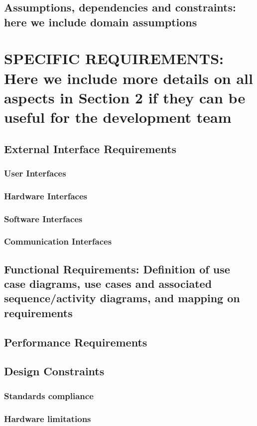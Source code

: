 \documentclass[12pt,a4paper]{article}
\begin{document}
\subsection{Assumptions, dependencies and constraints: here we include domain assumptions } 
\section{SPECIFIC REQUIREMENTS: Here we include more details on all aspects in Section 2 if they 
can be useful for the development team}
\subsection{External Interface Requirements} 
\subsubsection{User Interfaces}
\subsubsection{Hardware Interfaces}
\subsubsection{Software Interfaces}
\subsubsection{Communication Interfaces}
\subsection{Functional  Requirements:  Definition  of  use  case  diagrams,  use  cases  and  associated 
sequence/activity diagrams, and mapping on requirements} 
\subsection{Performance Requirements} 
\subsection{Design Constraints}
\subsubsection{Standards compliance}
\subsubsection{Hardware limitations}
\end{document}
